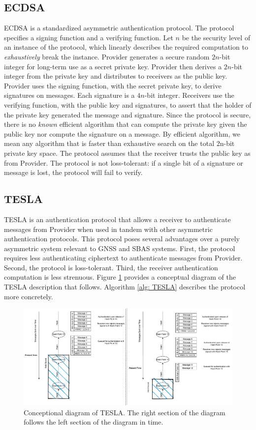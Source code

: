 \documentclass[letterpaper,times]{IONconf/IONconf}
\begin{document}
\subsection{ECDSA}
ECDSA is a standardized asymmetric authentication protocol.
The protocol specifies a signing function and a verifying function.
Let $n$ be the security level of an instance of the protocol, which linearly describes the required computation to {\em exhaustively} break the instance.
Provider generates a secure random $2n$-bit integer for long-term use as a secret private key.
Provider then derives a $2n$-bit integer from the private key and distributes to receivers as the public key.
Provider uses the signing function, with the secret private key, to derive signatures on messages.
Each signature is a $4n$-bit integer.
Receivers use the verifying function, with the public key and signatures, to assert that the holder of the private key generated the message and signature.
Since the protocol is secure, there is no {\em known} efficient algorithm that can compute the private key given the public key nor compute the signature on a message.
By efficient algorithm, we mean any algorithm that is faster than exhaustive search on the total 2n-bit private key space.
The protocol assumes that the receiver trusts the public key as from Provider.
The protocol is not loss-tolerant: if a single bit of a signature or message is lost, the protocol will fail to verify.

\subsection{TESLA} \label{sec: TESLA intro}

TESLA is an authentication protocol that allows a receiver to authenticate messages from Provider when used in tandem with other asymmetric authentication protocols.
This protocol poses several advantages over a purely asymmetric system relevant to GNSS and SBAS systems.
First, the protocol requires less authenticating ciphertext to authenticate messages from Provider.
Second, the protocol is loss-tolerant.
Third, the receiver authentication computation is less strenuous.
Figure \ref{fig: TESLA Diagram} provides a conceptual diagram of the TESLA description that follows.
Algorithm \ref{alg: TESLA} describes the protocol more concretely.

\begin{figure}
\centering
\includegraphics[width=\linewidth]{fig/TESLADiagram.pdf}
\caption{Conceptional diagram of TESLA. The right section of the diagram follows the left section of the diagram in time.}
\label{fig: TESLA Diagram}
\end{figure}
\end{document}
